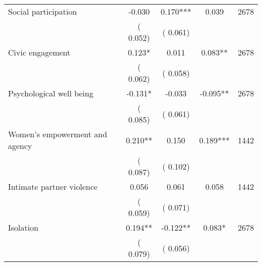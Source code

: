 \begin{tabular}{l*{4}{c}}
 Social participation &             -0.030 &         0.170*** &           0.039 & 2678                       \\  
                 &        (       0.052)                   &        (       0.061)                        &                                                             &                                                      \\      

 Civic engagement &              0.123* &         0.011 &           0.083** & 2678                       \\  
                 &        (       0.062)                   &        (       0.058)                        &                                                             &                                                      \\      

 Psychological well being &             -0.131* &        -0.033 &          -0.095** & 2678                       \\  
                 &        (       0.085)                   &        (       0.061)                        &                                                             &                                                      \\      

 Women's empowerment and agency &              0.210** &         0.150 &           0.189*** & 1442                       \\  
                 &        (       0.087)                   &        (       0.102)                        &                                                             &                                                      \\      

 Intimate partner violence &              0.056 &         0.061 &           0.058 & 1442                       \\  
                 &        (       0.059)                   &        (       0.071)                        &                                                             &                                                      \\      

 Isolation &              0.194** &        -0.122** &           0.083* & 2678                       \\  
                 &        (       0.079)                   &        (       0.056)                        &                                                             &                                                      \\      


\end{tabular}
